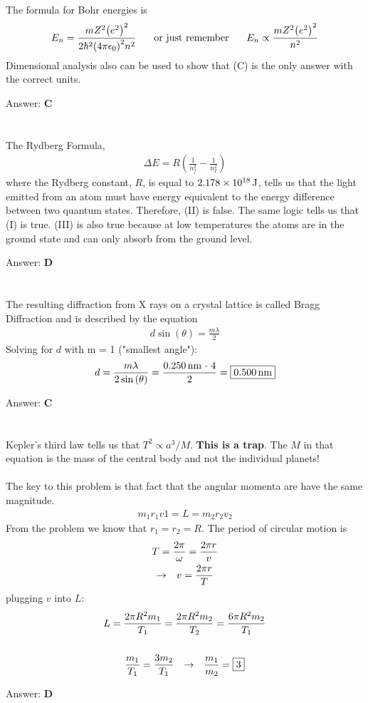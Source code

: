 \documentclass[12pt]{article}
\newcommand{\Answer}[1]{Answer: \textbf{#1}}
\newcommand{\Problem}[3]{
    \setcounter{section}{#1}
    \addtocounter{section}{-1}
    \section{}
    #3\par\par
    \Answer{#2}
}
\begin{document}
\Problem{50}{C}{%
The formula for Bohr energies is
\begin{align}
E_{n} = \frac{mZ^{2}{\left(e^{2}\right)}^{2}}{2 \hbar^{2} {\left(4 \pi \epsilon_{0}\right)}^{2} n^{2}}
\text{\hspace{.2in} or just remember \hspace{.2in}}
E_{n} \propto \frac{mZ^{2}{\left(e^{2}\right)}^{2}}{n^2}
\end{align}
Dimensional analysis also can be used to show that (C) is the only answer with the correct units.
}

\Problem{51}{D}{%
The Rydberg Formula,
\begin{align}
\Delta E = R \left( \frac{1}{n_{f}^{2}} - \frac{1}{n_{I}^{2}}\right)
\end{align}
where the Rydberg constant, $R$, is equal to $2.178\times 10^{18}\,\text{J}$, tells us that the light emitted from an atom must have energy equivalent to the energy difference between two quantum states. Therefore, (II) is false. The same logic tells us that (I) is true.  (III) is also true because at low temperatures the atoms are in the ground state and can only absorb from the ground level.
}

\Problem{52}{C}{%
The resulting diffraction from X rays on a crystal lattice is called Bragg Diffraction and is described by the equation
\begin{align}
d \sin{(\theta)} = \frac{m \lambda}{2}
\end{align}
Solving for $d$ with m = 1 ("smallest angle"):
\begin{align}
d = \frac{m \lambda}{2 \sin{(\theta)}} = \frac{0.250\,\text{nm $\cdot$ 4}}{2} = \boxed{0.500\,\text{nm}}\nonumber
\end{align}
}

\Problem{53}{D}{%
 Kepler's third law tells us that $T^{2} \propto a^{3}/M$. \textbf{This is a trap}. The $M$ in that equation is the mass of the central body and not the individual planets!\\\\
The key to this problem is that fact that the angular momenta are have the same magnitude.
\begin{align}
m_{1}r_{1}v{1} = L = m_{2}r_{2}v_{2}\nonumber
\end{align}
From the problem we know that $r_{1} = r_{2} = R $. The period of circular motion is
\begin{gather}
T = \frac{2 \pi}{\omega} = \frac{2 \pi r}{v}\\
\rightarrow \hspace{.1in} v = \frac{2 \pi r}{T}\nonumber
\end{gather}
plugging $v$ into $L$:
\begin{gather}
L = \frac{2 \pi R^2 m_{1}}{T_{1}} = \frac{2 \pi R^2 m_{2}}{T_{2}} = \frac{6 \pi R^2 m_{2}}{T_{1}}\nonumber\\
\nonumber\\
\frac{m_{1}}{T_{1}} = \frac{3 m_{2}}{T_{1}} \hspace{.1in} \rightarrow \hspace{.1in} \frac{m_{1}}{m_{2}} = \boxed{3}\nonumber
\end{gather}
}
\end{document}
